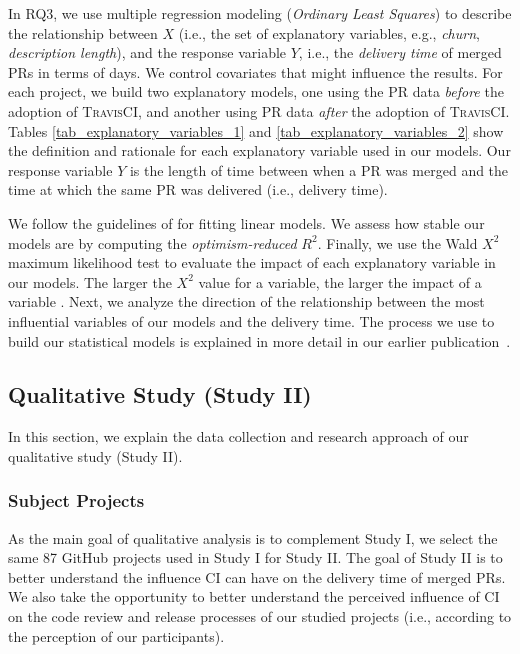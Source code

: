 In RQ3, we use multiple regression modeling ({\em Ordinary Least Squares}) to describe the
relationship between $X$ (i.e., the set of explanatory variables, e.g.,
\textit{churn}, \textit{description length}), and the response variable $Y$,
i.e., the \textit{delivery time} of merged PRs in terms of days. We control
covariates that might influence the results. For each project, we build two
explanatory models, one using the PR data \textit{before} the adoption of \textsc{TravisCI}, and another using
PR data \textit{after} the adoption of \textsc{TravisCI}. Tables \ref{tab_explanatory_variables_1} and \ref{tab_explanatory_variables_2} show the definition and rationale for each explanatory variable used in our
models. Our response variable $Y$ is the length of time between when a PR was merged and the time at which the same PR was delivered (i.e., delivery time).

We follow the guidelines of \citet{harrell2015regression} for fitting linear models.  We assess how stable our models are by computing the \textit{optimism-reduced} $R^2$. Finally, we use the Wald $X^2$ maximum likelihood test to evaluate the impact of each explanatory variable in our models. The larger the $X^2$ value for a variable, the larger the impact of a variable \citep{Da_Costa2016-cb}.
Next, we analyze the direction of the relationship between the most influential variables of our models and the delivery time. 
The process we use to build our statistical models is explained in more detail in our earlier publication~\citep{bernardo2018studying}.

\subsection{\textbf{Qualitative Study (Study II)}}
\label{sec:qualitative_study}

In this section, we explain the data collection and research approach of our qualitative study (Study II).

\subsubsection{Subject Projects}
\label{sec:subject_projects}

As the main goal of qualitative analysis is to complement Study I, we select the same 87 GitHub projects used in Study I for Study II. 
The goal of Study II is to better understand the influence CI can have on the delivery time of merged PRs.
We also take the opportunity to better understand the perceived influence of CI on the code review and release processes of our studied projects (i.e., according to the perception of our participants).

